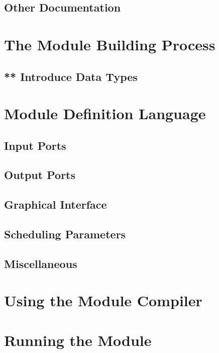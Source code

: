\section{Other Documentation}




\chapter{The Module Building Process}


\section{** Introduce Data Types}




\chapter{Module Definition Language}


\section{Input Ports}


\section{Output Ports}


\section{Graphical Interface}


\section{Scheduling Parameters}


\section{Miscellaneous}




\chapter{Using the Module Compiler}




\chapter{Running the Module}





